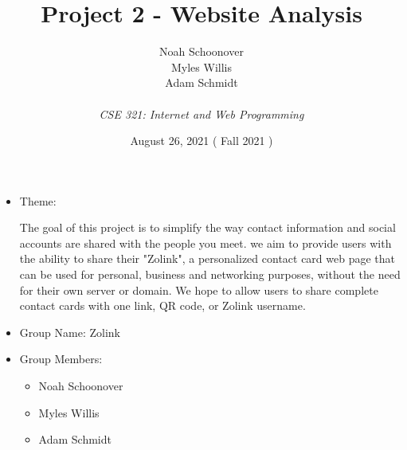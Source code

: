 \documentclass[12pt]{article}%
\def\assignmentName { Project 2 - Website Analysis                      }
\def\className      { CSE 321: Internet and Web Programming             }
\def\studentName    { Noah Schoonover \\ Myles Willis \\ Adam Schmidt   }
\def\studentEmail   {  }
\def\dueDate        { August 26, 2021                                   }
\def\semesterDate   { Fall 2021                                         }
\begin{document}


\begin{singlespace}
\title{ \assignmentName }
\author{ \studentName \\ {\small \studentEmail} \\ {\it \className}}
\date{\dueDate (\semesterDate)}
\maketitle
\end{singlespace}



\begin{itemize}
    \item Theme: 
    
    The goal of this project is to simplify the way contact information and social accounts are shared with the people you meet. 
    we aim to provide users with the ability to share their "Zolink", a personalized contact card web page that can be used for personal, 
    business and networking purposes, without the need for their own server or domain. We hope to allow users to share complete 
    contact cards with one link, QR code, or Zolink username.
    
    \item Group Name: Zolink
    \item Group Members:
    \begin{itemize}
    	\item Noah Schoonover
    	\item Myles Willis
    	\item Adam Schmidt
    \end{itemize}
\end{itemize}
\end{document}

